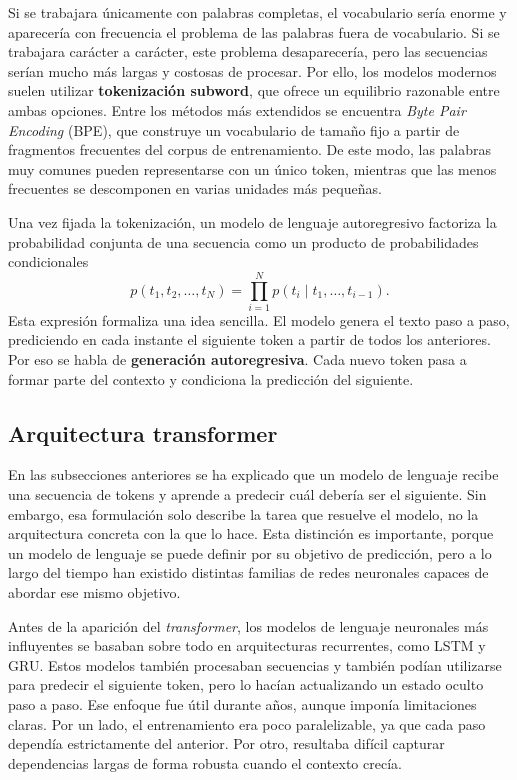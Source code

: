 Si se trabajara únicamente con palabras completas, el vocabulario sería enorme y aparecería con frecuencia el problema de las palabras fuera de vocabulario. Si se trabajara carácter a carácter, este problema desaparecería, pero las secuencias serían mucho más largas y costosas de procesar. Por ello, los modelos modernos suelen utilizar \textbf{tokenización subword}, que ofrece un equilibrio razonable entre ambas opciones. Entre los métodos más extendidos se encuentra \textit{Byte Pair Encoding} (BPE), que construye un vocabulario de tamaño fijo a partir de fragmentos frecuentes del corpus de entrenamiento. De este modo, las palabras muy comunes pueden representarse con un único token, mientras que las menos frecuentes se descomponen en varias unidades más pequeñas.

Una vez fijada la tokenización, un modelo de lenguaje autoregresivo factoriza la probabilidad conjunta de una secuencia como un producto de probabilidades condicionales
\[
p(t_1, t_2, \dots, t_N) = \prod_{i=1}^{N} p(t_i \mid t_1, \dots, t_{i-1}).
\]
Esta expresión formaliza una idea sencilla. El modelo genera el texto paso a paso, prediciendo en cada instante el siguiente token a partir de todos los anteriores. Por eso se habla de \textbf{generación autoregresiva}. Cada nuevo token pasa a formar parte del contexto y condiciona la predicción del siguiente.

\subsection{Arquitectura transformer}

En las subsecciones anteriores se ha explicado que un modelo de lenguaje recibe una secuencia de tokens y aprende a predecir cuál debería ser el siguiente. Sin embargo, esa formulación solo describe la tarea que resuelve el modelo, no la arquitectura concreta con la que lo hace. Esta distinción es importante, porque un modelo de lenguaje se puede definir por su objetivo de predicción, pero a lo largo del tiempo han existido distintas familias de redes neuronales capaces de abordar ese mismo objetivo.

Antes de la aparición del \textit{transformer}, los modelos de lenguaje neuronales más influyentes se basaban sobre todo en arquitecturas recurrentes, como LSTM y GRU. Estos modelos también procesaban secuencias y también podían utilizarse para predecir el siguiente token, pero lo hacían actualizando un estado oculto paso a paso. Ese enfoque fue útil durante años, aunque imponía limitaciones claras. Por un lado, el entrenamiento era poco paralelizable, ya que cada paso dependía estrictamente del anterior. Por otro, resultaba difícil capturar dependencias largas de forma robusta cuando el contexto crecía.

